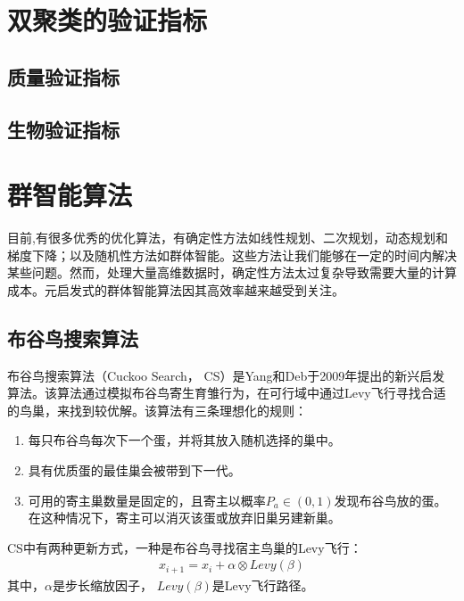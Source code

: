 

  
\section{双聚类的验证指标}
  \subsection{质量验证指标}

  \subsection{生物验证指标}

\section{群智能算法}

    目前,有很多优秀的优化算法，有确定性方法如线性规划、二次规划，动态规划和梯度下降；以及随机性方法如群体智能。这些方法让我们能够在一定的时间内解决某些问题。然而，处理大量高维数据时，确定性方法太过复杂导致需要大量的计算成本。元启发式的群体智能算法因其高效率越来越受到关注。

  \subsection{布谷鸟搜索算法}
    布谷鸟搜索算法（Cuckoo Search， CS）是Yang和Deb于2009年提出的新兴启发算法。该算法通过模拟布谷鸟寄生育雏行为，在可行域中通过Levy飞行寻找合适的鸟巢，来找到较优解。该算法有三条理想化的规则：
    \begin{enumerate}
      \item {每只布谷鸟每次下一个蛋，并将其放入随机选择的巢中。}
      \item {具有优质蛋的最佳巢会被带到下一代。}
      \item {可用的寄主巢数量是固定的，且寄主以概率$P_a\in(0,1)$发现布谷鸟放的蛋。在这种情况下，寄主可以消灭该蛋或放弃旧巢另建新巢。}
    \end{enumerate}

    CS中有两种更新方式，一种是布谷鸟寻找宿主鸟巢的Levy飞行：
    \begin{align}
      x_{i+1}=x_i+\alpha\otimes Levy(\beta)
    \end{align}
    其中，$\alpha$是步长缩放因子， $Levy(\beta)$是Levy飞行路径。

